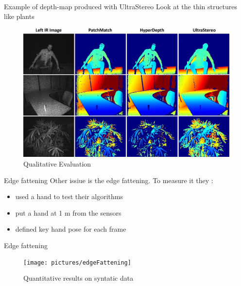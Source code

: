 \begin{frame}{Example of depth-map produced with UltraStereo}
Look at the thin structures like plants
\begin{figure}
\includegraphics[scale=0.08]{pictures/fig5}
\caption{Qualitative Evaluation}
\end{figure}
\end{frame}

\begin{frame}{Edge fattening}
Other issiue is the edge fattening. To measure it they :
\begin{itemize}
\item used a hand to test their algorithms
\item put a hand at 1 m from the sensors
\item defined key hand pose for each frame
\end{itemize}
\end{frame}

\begin{frame}{Edge fattening}

\begin{figure}
\texttt{[image: pictures/edgeFattening]}
\caption{Quantitative results on syntatic data}
\end{figure}
\end{frame}

